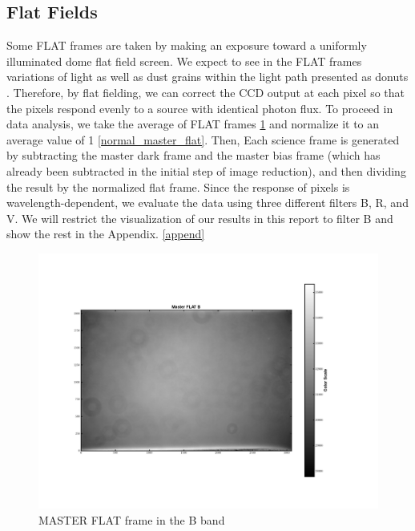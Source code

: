 \documentclass[12pt]{article}
\begin{document}
\subsection{Flat Fields}
Some FLAT frames are taken by making an exposure toward a uniformly illuminated dome flat field screen. We expect to see in the FLAT frames variations of light as well as dust grains within the light path presented as donuts \cite{lecturenote}. Therefore, by flat fielding, we can correct the CCD output at each pixel so that the pixels respond evenly to a source with identical photon flux. To proceed in data analysis, we take the average of FLAT frames \ref{master_flat} and normalize it to an average value of 1 \ref{normal_master_flat}. Then, Each science frame is generated by subtracting the master dark frame and the master bias frame (which has already been subtracted in the initial step of image reduction), and then dividing the result by the normalized flat frame. Since the response of pixels is wavelength-dependent, we evaluate the data using three different filters B, R, and V. We will restrict the visualization of our results in this report to filter B and show the rest in the Appendix. \ref{append}

\begin{figure}[H]
    \centering
    \includegraphics[width=\textwidth]{fig/Master_FLAT_B.png}
    \caption{MASTER FLAT frame in the B band}
    \label{master_flat}
\end{figure}
\end{document}
